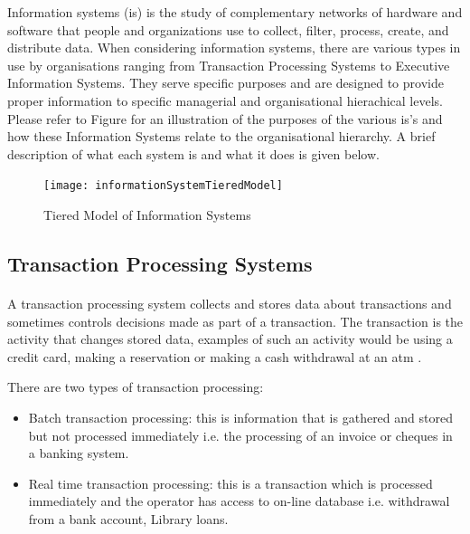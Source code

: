Information systems (\acrshort{is}) is the study of complementary networks of hardware and software that people and organizations use to collect, filter, process, create, and distribute data\cite{Denning1999}. When considering information systems, there are various types in use by organisations ranging from Transaction Processing Systems to Executive Information Systems. They serve specific purposes and are designed to provide proper information to specific managerial and organisational hierachical levels. Please refer to Figure for an illustration of the purposes of the various \acrshort{is}'s and how these Information Systems relate to the organisational hierarchy. A brief description of what each system is and what it does is given below.

\begin{figure}[H]
\centering
\texttt{[image: informationSystemTieredModel]}
\caption[Tiered Model of Information Systems]{Tiered Model of Information Systems \cite{Laudon1988}}
\label{image-informationSystemTieredModel}
\end{figure}


\subsection{Transaction Processing Systems}

\paragraph{} A transaction processing system collects and stores data about transactions and sometimes controls decisions made as part of a transaction. The transaction is the activity that changes stored data, examples of such an activity would be using a credit card, making a reservation or making a cash withdrawal at an \acrshort{atm} \cite{NSWHSC2013}.

There are two types of transaction processing:

\begin{itemize}
\item Batch transaction processing: this is information that is gathered and stored but not processed immediately i.e. the processing of an invoice or cheques in a banking system.
\item Real time transaction processing: this is a transaction which is processed immediately and the operator has access to on-line database i.e. withdrawal from a bank account, Library loans.
\end{itemize}

